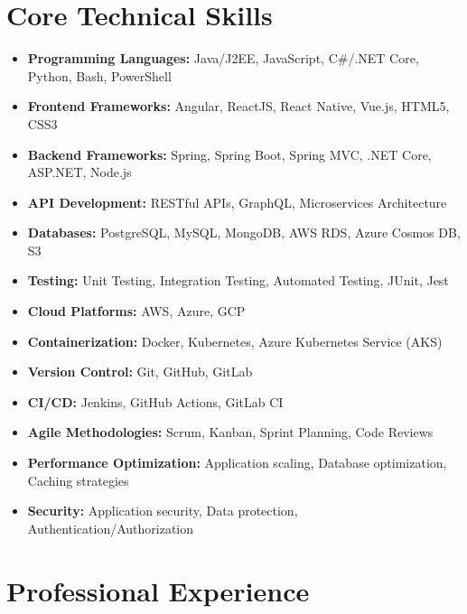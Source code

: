 \documentclass[11pt,a4paper]{article}
\begin{document}
\section*{Core Technical Skills}
\begin{itemize}[noitemsep]
\item \textbf{Programming Languages:} Java/J2EE, JavaScript, C\#/.NET Core, Python, Bash, PowerShell
\item \textbf{Frontend Frameworks:} Angular, ReactJS, React Native, Vue.js, HTML5, CSS3
\item \textbf{Backend Frameworks:} Spring, Spring Boot, Spring MVC, .NET Core, ASP.NET, Node.js
\item \textbf{API Development:} RESTful APIs, GraphQL, Microservices Architecture
\item \textbf{Databases:} PostgreSQL, MySQL, MongoDB, AWS RDS, Azure Cosmos DB, S3
\item \textbf{Testing:} Unit Testing, Integration Testing, Automated Testing, JUnit, Jest
\item \textbf{Cloud Platforms:} AWS, Azure, GCP
\item \textbf{Containerization:} Docker, Kubernetes, Azure Kubernetes Service (AKS)
\item \textbf{Version Control:} Git, GitHub, GitLab
\item \textbf{CI/CD:} Jenkins, GitHub Actions, GitLab CI
\item \textbf{Agile Methodologies:} Scrum, Kanban, Sprint Planning, Code Reviews
\item \textbf{Performance Optimization:} Application scaling, Database optimization, Caching strategies
\item \textbf{Security:} Application security, Data protection, Authentication/Authorization
\end{itemize}

\section*{Professional Experience}
\end{document}
